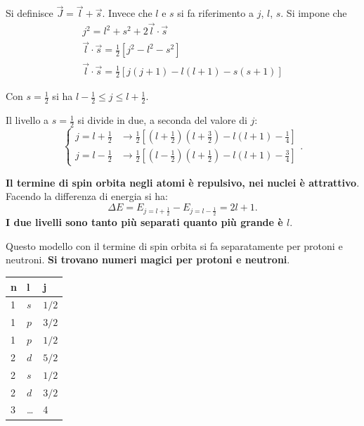 \documentclass[a4paper,11pt,twoside,openany]{book}
\theoremstyle{definition}
\theoremstyle{plain}
\theoremstyle{plain}
\theoremstyle{definition}
\begin{document}
Si definisce $\vec J=\vec l +\vec s$. Invece che $l$ e $s$ si fa riferimento a $j$, $l$, $s$. Si impone che \begin{equation}
\begin{split}
j^2=l^2+s^2+2\vec l\cdot\vec s\\
\vec l\cdot\vec s=\frac{1}{2}\left[j^2-l^2-s^2\right]\\
\vec l\cdot\vec s=\frac{1}{2}\left[j(j+1)-l(l+1)-s(s+1)\right]
\end{split}
\end{equation}

Con $s=\frac{1}{2}$ si ha $l-\frac{1}{2}\le j\le l+\frac{1}{2}$.

Il livello a $s=\frac{1}{2}$ si divide in due, a seconda del valore di $j$:
\begin{equation}
\begin{cases}
j=l+\frac{1}{2} & \longrightarrow \frac{1}{2}\left[\left(l+\frac{1}{2}\right)\left(l+\frac{3}{2}\right)-l\left(l+1\right)-\frac{1}{4}\right] \\
j=l-\frac{1}{2} & \longrightarrow \frac{1}{2}\left[\left(l-\frac{1}{2}\right)\left(l+\frac{1}{2}\right)-l\left(l+1\right)-\frac{3}{4}\right]
\end{cases}.
\end{equation}

\textbf{Il termine di spin orbita negli atomi è repulsivo, nei nuclei è attrattivo}. Facendo la differenza di energia si ha:
\begin{equation}
\Delta E=E_{j=l+\frac{1}{2}}-E_{j=l-\frac{1}{2}}=2l+1.
\end{equation}
\textbf{I due livelli sono tanto più separati quanto più grande è $l$}.

Questo modello con il termine di spin orbita si fa separatamente per protoni e neutroni. \textbf{Si trovano numeri magici per protoni e neutroni}.

\begin{center}\begin{tabularx}{\textwidth}{XXl}
\toprule
n & l & j\\
\midrule
1 & $s$ & $1/2$ \\
1 & $p$ & $3/2$ \\
1 & $p$ & $1/2$ \\
2 & $d$ & $5/2$ \\
2 & $s$ & $1/2$ \\
2 & $d$ & $3/2$ \\
3 & \dots & 4 \\
\bottomrule
\end{tabularx}\end{center}
\end{document}

